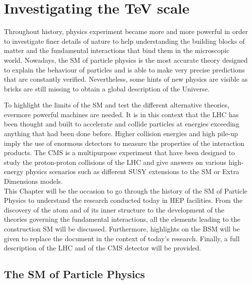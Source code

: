 \renewcommand\evenpagerightmark{{\scshape\small Chapter 2}}
\renewcommand\oddpageleftmark{{\scshape\small Investigating the \si{TeV} scale}}

\renewcommand{\bibname}{References}

\hyphenation{}

\chapter[Investigating the \si{TeV} scale]%
{Investigating the \si{TeV} scale}
\label{chapt:2}

	Throughout history, physics experiment became more and more powerful in order to investigate finer details of nature to help understanding the building blocks of matter and the fundamental interactions that bind them in the microscopic world. Nowadays, the \acl{SM} of particle physics is the most accurate theory designed to explain the behaviour of particles and is able to make very precise predictions that are constantly verified. Nevertheless, some hints of new physics are visible as bricks are still missing to obtain a global description of the Universe.
	
	To highlight the limits of the SM and test the different alternative theories, evermore powerful machines are needed. It is in this context that the \acl{LHC} has been thought and built to accelerate and collide particles at energies exceeding anything that had been done before. Higher collision energies and high pile-up imply the use of enormous detectors to measure the properties of the interaction products. The \acl{CMS} is a multipurpose experiment that have been designed to study the proton-proton collisions of the LHC and give answers on various high-energy physics scenarios such as different \acf{SUSY} extensions to the \acl{SM} or Extra Dimensions models.\\
	
	This Chapter will be the occasion to go through the history of the \acl{SM} of Particle Physics to understand the research conducted today in \acf{HEP} facilities. From the discovery of the atom and of its inner structure to the development of the theories governing the fundamental interactions, all the elements leading to the construction SM will be discussed. Furthermore, highlights on the \acf{BSM} will be given to replace the document in the context of today's research. Finally, a full description of the LHC and of the CMS detector will be provided.

\section{The \acl{SM} of Particle Physics}
\label{chapt2:sec:SM}

